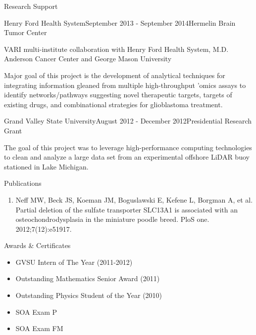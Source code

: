 \documentclass{resume} %
\begin{document}
\begin{rSection}{Research Support}
\begin{rSubsection}{Henry Ford Health System}{September 2013 - September 2014}{Hermelin Brain Tumor Center}{}
\item VARI multi-institute collaboration with Henry Ford Health System, M.D. Anderson Cancer Center and George Mason University
\item Major goal of this project is the development of analytical techniques for integrating information gleaned from multiple high-throughput ’omics assays to identify networks/pathways suggesting novel therapeutic targets, targets of existing drugs, and combinational strategies for glioblastoma treatment.
\end{rSubsection}

\begin{rSubsection}{Grand Valley State University}{August 2012 - December 2012}{Presidential Research Grant}{}
\item The goal of this project was to leverage high-performance computing technologies to clean and analyze a large data set from an experimental offshore LiDAR buoy stationed in Lake Michigan.
\end{rSubsection}

\end{rSection}


\begin{rSection}{Publications}
\begin{enumerate}
\item Neff MW, Beck JS, Koeman JM, Boguslawski E, Kefene L, Borgman A, et al. Partial deletion of the sulfate transporter SLC13A1 is associated with an osteochondrodysplasia in the miniature poodle breed. PloS one. 2012;7(12):e51917.
\end{enumerate}
\end{rSection}


\begin{rSection}{Awards \& Certificates}
\begin{itemize}
\item GVSU Intern of The Year (2011-2012)
\item Outstanding Mathematics Senior Award (2011)
\item Outstanding Physics Student of the Year (2010)
\item SOA Exam P
\item SOA Exam FM
\end{itemize}
\end{rSection}
\end{document}
